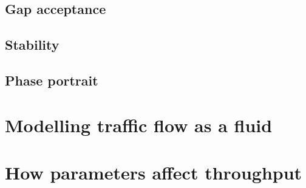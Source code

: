 \documentclass[11pt,a4paper]{report}
\begin{document}
\subsection{Gap acceptance}
\subsection{Stability}
\subsection{Phase portrait}

\section{Modelling traffic flow as a fluid}

\section{How parameters affect throughput}

\begin{thebibliography}{99}


\end{thebibliography}
\end{document}
